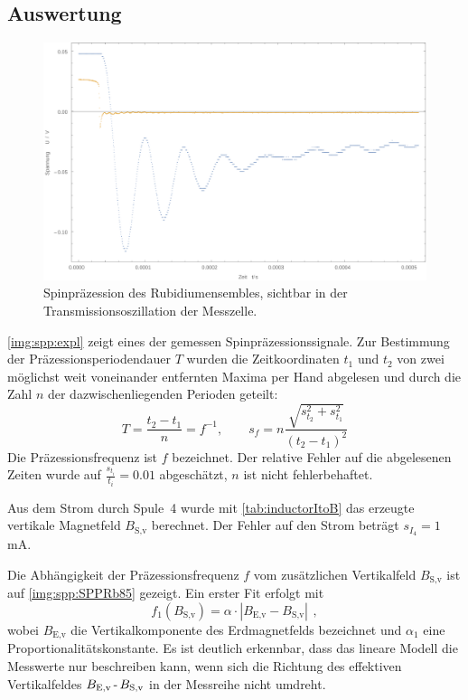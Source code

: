 \subsection{Auswertung}
\begin{figure}[H]
\begin{center}
  \includegraphics[width=\textwidth]{../img/part4/dummyExampleSpinpr.pdf}
  \caption{Spinpräzession des Rubidiumensembles, sichtbar in der Transmissionsoszillation der Messzelle.}
  \label{img:spp:expl}
\end{center}
\end{figure} 

\autoref{img:spp:expl} zeigt eines der gemessen Spinpräzessionssignale.
Zur Bestimmung der Präzessionsperiodendauer $T$ wurden die Zeitkoordinaten $t_1$ und $t_2$
von zwei möglichst weit voneinander entfernten Maxima per Hand abgelesen und durch
die Zahl $n$ der dazwischenliegenden Perioden geteilt:
\begin{equation}
  T=\frac{t_2-t_1}{n}=f^{-1}, \qquad s_f = n \frac{\sqrt{s_{t_2}^2 + s_{t_1}^2}}{ \left( t_2 -t_1 \right)^2 }
\end{equation}
Die Präzessionsfrequenz ist $f$ bezeichnet.
Der relative Fehler auf die abgelesenen Zeiten wurde auf $\frac{s_{t_i}}{t_i}=0.01$ abgeschätzt,
$n$ ist nicht fehlerbehaftet.

Aus dem Strom durch Spule~4 wurde mit \autoref{tab:inductorItoB} das erzeugte vertikale Magnetfeld
$B_\text{S,v}$ berechnet. Der Fehler auf den Strom beträgt $s_{I_4}=1$\,mA.

Die Abhängigkeit der Präzessionsfrequenz $f$ vom zusätzlichen Vertikalfeld $B_\text{S,v}$ ist auf
\autoref{img:spp:SPPRb85} gezeigt.
Ein erster Fit erfolgt mit
\begin{equation}
  f_1(B_\text{S,v})=\alpha \cdot |B_\text{E,v}-B_\text{S,v}| \ \, ,
\end{equation}
wobei $B_\text{E,v}$ die Vertikalkomponente des Erdmagnetfelds bezeichnet und
$\alpha_1$ eine Proportionalitätskonstante.
Es ist deutlich erkennbar, dass das lineare Modell die Messwerte nur beschreiben kann,
wenn sich die Richtung des effektiven Vertikalfeldes
$B_\text{E,v} \text{\,-\,} B_\text{S,v}$ in der Messreihe nicht umdreht.


